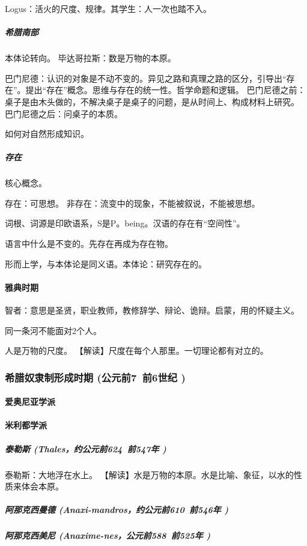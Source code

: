 \documentclass[UTF8]{../RepresentationUniverse}
\begin{document}
    Logus：活火的尺度、规律。其学生：人一次也踏不入。


    \subparagraph{希腊南部}

    本体论转向。
    毕达哥拉斯：数是万物的本原。

    巴门尼德：认识的对象是不动不变的。异见之路和真理之路的区分，引导出“存在”。提出“存在”概念。思维与存在的统一性。哲学命题和逻辑。
    巴门尼德之前：桌子是由木头做的，不解决桌子是桌子的问题，是从时间上、构成材料上研究。
    巴门尼德之后：问桌子的本质。

    如何对自然形成知识。

    \subparagraph{存在}

    核心概念。

    存在：可思想。
    非存在：流变中的现象，不能被叙说，不能被思想。

    词根、词源是印欧语系，S是P。being。汉语的存在有“空间性”。

    语言中什么是不变的。先存在再成为存在物。

    形而上学，与本体论是同义语。本体论：研究存在的。

    
    \paragraph{雅典时期}

    智者：意思是圣贤，职业教师，教修辞学、辩论、诡辩。启蒙，用的怀疑主义。

    同一条河不能面对2个人。

    人是万物的尺度。
    【解读】尺度在每个人那里。一切理论都有对立的。


    \subsubsection{希腊奴隶制形成时期 (公元前7~前6世纪 )}
        \paragraph{爱奥尼亚学派}
        \paragraph{米利都学派}
            \subparagraph{泰勒斯 (Thales，约公元前624~前547年 )}

            泰勒斯：大地浮在水上。
    【解读】水是万物的本原。水是比喻、象征，以水的性质来体会本原。
    
            \subparagraph{阿那克西曼德 (Anaxi-mandros，约公元前610~前546年 )}
            \subparagraph{阿那克西美尼 (Anaxime-nes，公元前588~前525年 )}
\end{document}
